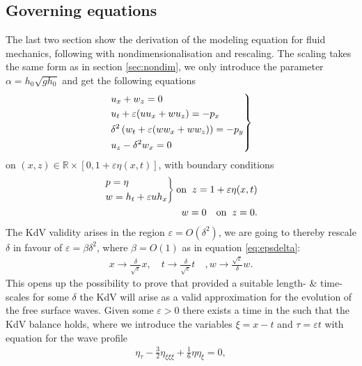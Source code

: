 \subsection{Governing equations}
The last two section show the derivation of the modeling equation for fluid
mechanics, following with nondimensionalisation and rescaling. The scaling
takes the same form as in section \ref{sec:nondim}, we only introduce the
parameter $\alpha = h_0\sqrt{gh_0} $ and get the following equations
\begin{align}
    \begin{drcases}
    u_x + w_z = 0\\
    u_t + \varepsilon(uu_x + wu_z) = -p_x\\
    \delta^2\left(w_t + \varepsilon(w w_x + w w_z)\right) = -p_y\\
    u_z - \delta^2 w_x = 0
    \end{drcases}
\end{align}
on $(x, z) \in \mathbb{R}\times [0, 1+\varepsilon \eta(x, t)]$, with boundary
conditions
\begin{align}
    \begin{drcases}
        p = \eta \\
        w = h_t + \varepsilon u h_x
    \end{drcases}
    \text{on}\;\; z = 1+\varepsilon \eta(x, t)\\
    w = 0 \quad \text{on}\;\; z = 0.
\end{align}
The KdV validity arises in the region $\varepsilon = O(\delta^2)$, we are
going to thereby rescale $\delta$ in favour of $\varepsilon = \beta
\delta^2$, where $\beta = O(1)$ as in equation \ref{eq:epsdelta}:
\begin{align}\label{eq:epsdelta}
    x \rightarrow \frac{\delta}{\sqrt{\varepsilon} }x, \quad t
    \rightarrow \frac{\delta}{\sqrt{\varepsilon} }t\quad,
    w \rightarrow \frac{\sqrt{\varepsilon} }{\delta}w.
\end{align}
This opens up the possibility to prove that provided a suitable length- \&
time-scales for some $\delta$ the KdV will arise as a valid approximation for
the evolution of the free surface waves. Given some $\varepsilon>0$ there
exists a time in the such that the KdV balance holds, where we introduce the
variables $\xi = x- t$ and $\tau = \varepsilon t$ with equation for the wave profile
\begin{align}
    \eta_\tau - \frac{3}{2} \eta_{\xi\xi\xi} + \frac{1}{6} \eta \eta_\xi = 0,
\end{align}
